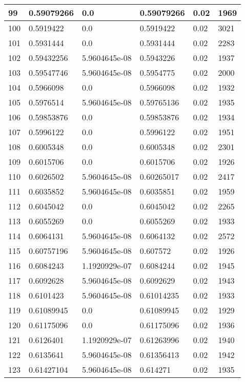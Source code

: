 \begin{longtable}{|l|l|l|l|l|l|}
99 & 0.59079266 & 0.0 & 0.59079266 & 0.02 & 1969 \\ \hline 
100 & 0.5919422 & 0.0 & 0.5919422 & 0.02 & 3021 \\ \hline 
101 & 0.5931444 & 0.0 & 0.5931444 & 0.02 & 2283 \\ \hline 
102 & 0.59432256 & 5.9604645e-08 & 0.5943226 & 0.02 & 1937 \\ \hline 
103 & 0.59547746 & 5.9604645e-08 & 0.5954775 & 0.02 & 2000 \\ \hline 
104 & 0.5966098 & 0.0 & 0.5966098 & 0.02 & 1932 \\ \hline 
105 & 0.5976514 & 5.9604645e-08 & 0.59765136 & 0.02 & 1935 \\ \hline 
106 & 0.59853876 & 0.0 & 0.59853876 & 0.02 & 1934 \\ \hline 
107 & 0.5996122 & 0.0 & 0.5996122 & 0.02 & 1951 \\ \hline 
108 & 0.6005348 & 0.0 & 0.6005348 & 0.02 & 2301 \\ \hline 
109 & 0.6015706 & 0.0 & 0.6015706 & 0.02 & 1926 \\ \hline 
110 & 0.6026502 & 5.9604645e-08 & 0.60265017 & 0.02 & 2417 \\ \hline 
111 & 0.6035852 & 5.9604645e-08 & 0.6035851 & 0.02 & 1959 \\ \hline 
112 & 0.6045042 & 0.0 & 0.6045042 & 0.02 & 2265 \\ \hline 
113 & 0.6055269 & 0.0 & 0.6055269 & 0.02 & 1933 \\ \hline 
114 & 0.6064131 & 5.9604645e-08 & 0.6064132 & 0.02 & 2572 \\ \hline 
115 & 0.60757196 & 5.9604645e-08 & 0.607572 & 0.02 & 1926 \\ \hline 
116 & 0.6084243 & 1.1920929e-07 & 0.6084244 & 0.02 & 1945 \\ \hline 
117 & 0.6092628 & 5.9604645e-08 & 0.6092629 & 0.02 & 1943 \\ \hline 
118 & 0.6101423 & 5.9604645e-08 & 0.61014235 & 0.02 & 1933 \\ \hline 
119 & 0.61089945 & 0.0 & 0.61089945 & 0.02 & 1929 \\ \hline 
120 & 0.61175096 & 0.0 & 0.61175096 & 0.02 & 1936 \\ \hline 
121 & 0.6126401 & 1.1920929e-07 & 0.61263996 & 0.02 & 1940 \\ \hline 
122 & 0.6135641 & 5.9604645e-08 & 0.61356413 & 0.02 & 1942 \\ \hline 
123 & 0.61427104 & 5.9604645e-08 & 0.614271 & 0.02 & 1935 \\ \hline 

\end{longtable}
